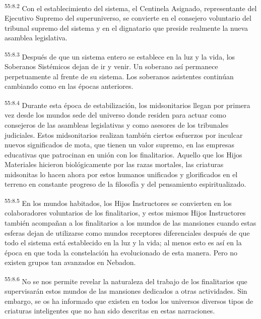 \par
\textsuperscript{55:8.2} Con el establecimiento del sistema, el Centinela Asignado, representante del Ejecutivo Supremo del superuniverso, se convierte en el consejero voluntario del tribunal supremo del sistema y en el dignatario que preside realmente la nueva asamblea legislativa.

\par
\textsuperscript{55:8.3} Después de que un sistema entero se establece en la luz y la vida, los Soberanos Sistémicos dejan de ir y venir. Un soberano así permanece perpetuamente al frente de su sistema. Los soberanos asistentes continúan cambiando como en las épocas anteriores.

\par
\textsuperscript{55:8.4} Durante esta época de estabilización, los midsonitarios llegan por primera vez desde los mundos sede del universo donde residen para actuar como consejeros de las asambleas legislativas y como asesores de los tribunales judiciales. Estos midsonitarios realizan también ciertos esfuerzos por inculcar nuevos significados de mota, que tienen un valor supremo, en las empresas educativas que patrocinan en unión con los finalitarios. Aquello que los Hijos Materiales hicieron biológicamente por las razas mortales, las criaturas midsonitas lo hacen ahora por estos humanos unificados y glorificados en el terreno en constante progreso de la filosofía y del pensamiento espiritualizado.

\par
\textsuperscript{55:8.5} En los mundos habitados, los Hijos Instructores se convierten en los colaboradores voluntarios de los finalitarios, y estos mismos Hijos Instructores también acompañan a los finalitarios a los mundos de las mansiones cuando estas esferas dejan de utilizarse como mundos receptores diferenciales después de que todo el sistema está establecido en la luz y la vida; al menos esto es así en la época en que toda la constelación ha evolucionado de esta manera. Pero no existen grupos tan avanzados en Nebadon.

\par
\textsuperscript{55:8.6} No se nos permite revelar la naturaleza del trabajo de los finalitarios que supervisarán estos mundos de las mansiones dedicados a otras actividades. Sin embargo, se os ha informado que existen en todos los universos diversos tipos de criaturas inteligentes que no han sido descritas en estas narraciones.

